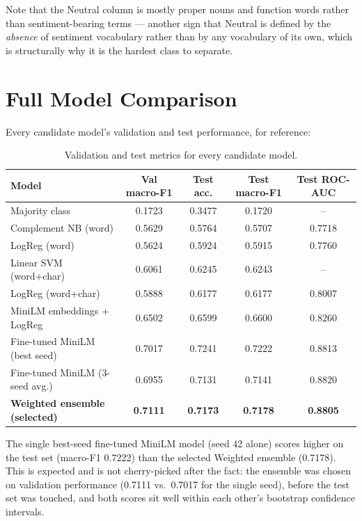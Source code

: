 \documentclass[11pt,a4paper]{article}
\begin{document}
Note that the Neutral column is mostly proper nouns and function words rather than sentiment-bearing terms --- another sign that Neutral is defined by the \emph{absence} of sentiment vocabulary rather than by any vocabulary of its own, which is structurally why it is the hardest class to separate.

\section{Full Model Comparison}

Every candidate model's validation and test performance, for reference:

\begin{table}[H]
\centering
\small
\begin{tabular}{@{}lcccc@{}}
\toprule
\textbf{Model} & \textbf{Val macro-F1} & \textbf{Test acc.} & \textbf{Test macro-F1} & \textbf{Test ROC-AUC} \\
\midrule
Majority class & 0.1723 & 0.3477 & 0.1720 & -- \\
Complement NB (word) & 0.5629 & 0.5764 & 0.5707 & 0.7718 \\
LogReg (word) & 0.5624 & 0.5924 & 0.5915 & 0.7760 \\
Linear SVM (word+char) & 0.6061 & 0.6245 & 0.6243 & -- \\
LogReg (word+char) & 0.5888 & 0.6177 & 0.6177 & 0.8007 \\
MiniLM embeddings + LogReg & 0.6502 & 0.6599 & 0.6600 & 0.8260 \\
Fine-tuned MiniLM (best seed) & 0.7017 & 0.7241 & 0.7222 & 0.8813 \\
Fine-tuned MiniLM (3-seed avg.) & 0.6955 & 0.7131 & 0.7141 & 0.8820 \\
\textbf{Weighted ensemble (selected)} & \textbf{0.7111} & \textbf{0.7173} & \textbf{0.7178} & \textbf{0.8805} \\
\bottomrule
\end{tabular}
\caption{Validation and test metrics for every candidate model.}
\end{table}

\begin{insightbox}
The single best-seed fine-tuned MiniLM model (seed 42 alone) scores higher on the test set (macro-F1 0.7222) than the selected Weighted ensemble (0.7178). This is expected and is not cherry-picked after the fact: the ensemble was chosen on validation performance (0.7111 vs.\ 0.7017 for the single seed), before the test set was touched, and both scores sit well within each other's bootstrap confidence intervals.
\end{insightbox}
\end{document}
